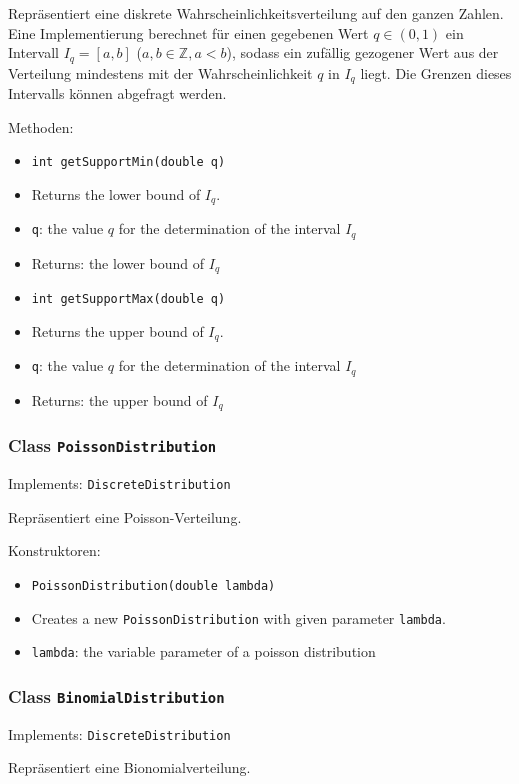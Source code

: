 \documentclass[parskip=full,11pt]{scrartcl}
\begin{document}
Repräsentiert eine diskrete Wahrscheinlichkeitsverteilung auf den ganzen Zahlen. Eine Implementierung berechnet für einen gegebenen Wert \(q \in (0,1)\) ein Intervall \(I_q = [a,b]\) (\(a,b \in \mathbb{Z}, a < b\)), sodass ein zufällig gezogener Wert aus der Verteilung mindestens mit der Wahrscheinlichkeit \(q\) in \(I_q\) liegt. Die Grenzen dieses Intervalls können abgefragt werden.

Methoden:
\begin{itemize}\itemsep -10pt
\item \texttt{int getSupportMin(double q)}
\item[] Returns the lower bound of \(I_q\).
\item[] \texttt{q}: the value \(q\) for the determination of the interval \(I_q\)
\item[] Returns: the lower bound of \(I_q\)

\item \texttt{int getSupportMax(double q)}
\item[] Returns the upper bound of \(I_q\).
\item[] \texttt{q}: the value \(q\) for the determination of the interval \(I_q\)
\item[] Returns: the upper bound of \(I_q\)
\end{itemize}

\subsubsection{Class \texttt{PoissonDistribution}}
Implements: \texttt{DiscreteDistribution}

Repräsentiert eine Poisson-Verteilung.

Konstruktoren:
\begin{itemize}\itemsep -10pt
\item \texttt{PoissonDistribution(double lambda)}
\item[] Creates a new \texttt{PoissonDistribution} with given parameter \texttt{lambda}.
\item[] \texttt{lambda}: the variable parameter of a poisson distribution
\end{itemize}

\subsubsection{Class \texttt{BinomialDistribution}}
Implements: \texttt{DiscreteDistribution}

Repräsentiert eine Bionomialverteilung.
\end{document}
